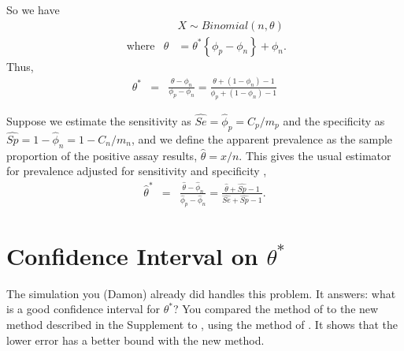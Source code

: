 \documentclass{article}
\begin{document}
So we have
\begin{eqnarray*}
& & X \sim Binomial \left(n, \theta \right)  \\
\mbox{ where} & \theta & = \theta^* \left\{ \phi_p - \phi_n \right\} + \phi_n.
\end{eqnarray*}
Thus,
\begin{eqnarray}
\theta^* & =  & \frac{ \theta - \phi_n }{ \phi_p - \phi_n}  = \frac{ \theta + (1 - \phi_n) -1  }{ \phi_p + (1 - \phi_n) -1 } \label{eq:thetastar}
\end{eqnarray}

Suppose we estimate the sensitivity as $\widehat{Se} = \hat{\phi}_p = C_p/m_p$ and the specificity as $\widehat{Sp} = 1-\hat{\phi}_n = 1- C_n/m_n$,
and we define the apparent prevalence as the sample proportion of the positive assay results, $\hat{\theta} = x/n$.
This gives the usual estimator for  prevalence adjusted for sensitivity and specificity
 \citep[see e.g.,][]{Roga:1978},
\begin{eqnarray*}
\hat{\theta}^* & = & \frac{ \hat{\theta} - \hat{\phi}_n }{\hat{\phi}_p - \hat{\phi}_n} = \frac{ \hat{\theta} + \widehat{Sp} -1 }{\widehat{Se} + \widehat{Sp} -1}.
\end{eqnarray*}


\section{Confidence Interval on $\theta^*$}
\label{sec-thetastar}

The simulation you (Damon) already did handles this problem. It answers: what is a good confidence interval for $\theta^*$?
You compared the method of \citet{Lang:2014} to the new method described in the Supplement to \citet{Kali:2021}, using the method of \citet{FayP:2015}.
It shows that the lower error has a better bound with the new method.
\end{document}
